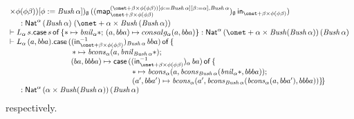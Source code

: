 \documentclass{lmcs}
\theoremstyle{plain}\newtheorem{satz}[thm]{Satz}
\newcommand{\ininv}[2]{(\tin^{-1}_{\onet +
  \beta \times \phi (\phi\beta)})_{#1}\, #2}
\newcommand{\map}{\mathsf{map}}
\begin{document}
{\[\begin{array}{l}
{  \times \phi (\phi\beta))[\phi := \mathit{Bush}\,\alpha]})_\emptyset\,
((\map_{\onet + \beta \times \phi (\phi\beta)}^{(\onet + \beta \times
  \phi (\phi\beta))[\phi := \mathit{Bush}\,\alpha][\beta := \alpha],
  \mathit{Bush}\,\alpha})_\emptyset\, \tin_{\onet + \beta \times \phi
  (\phi\beta)})\\[0.05in]
\hspace*{0.2in} : \Nat^{\alpha}\, (\mathit{Bush}\,\alpha)\; (\onet +
\alpha \times \mathit{Bush}\,(\mathit{Bush}\,\alpha))\\ 
  \vdash L_{\alpha} \, s. 
  \cse{s}{* \mapsto \mathit{bnil}_\alpha *}{(a, bba) \mapsto consalg_\alpha (a, bba)}
  : \Nat^\alpha \, (\onet + \alpha \times \mathit{Bush} (\mathit{Bush} \,\alpha)) \, (\mathit{Bush}\,\alpha) \\
  \vdash L_{\alpha} \, (a, bba).  
  \mathsf{case}\, (\ininv{\mathit{Bush}\,\alpha}{bba})\, \mathsf{of}\,\{
  \\
  \hspace{8em}\, * \mapsto \mathit{bcons}_{\alpha} (a,\mathit{bnil}_{\mathit{Bush}\,\alpha} *);  \\
  \hspace{8em} (ba, bbba) \mapsto \mathsf{case}\, (\ininv{\alpha}{ba})
  \, \mathsf{of}\,\{  \\ 
  \hspace{16em}* \mapsto \mathit{bcons}_\alpha (a, \mathit{bcons}_{\mathit{Bush}\,\alpha} 
        (\mathit{bnil}_\alpha *, bbba)) ;  \\ 
  \hspace{16em}(a', bba') \mapsto \mathit{bcons}_\alpha (a', \mathit{bcons}_{\mathit{Bush}\,\alpha}
  (\mathit{bcons}_\alpha (a, bba'), bbba)) \} \! \}\\    
\hspace*{0.2in} : \Nat^\alpha \, (\alpha \times \mathit{Bush} (\mathit{Bush} \,\alpha)) \, (\mathit{Bush}\,\alpha) \\
\end{array}\]
respectively. 

}
\end{document}
